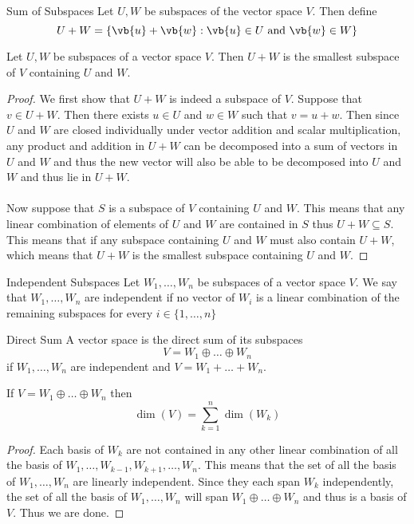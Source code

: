 \begin{defn}{Sum of Subspaces}{} Let $U,W$ be subspaces of the vector space $V$. Then define $$U+W=\{\vb{u}+\vb{w}:\vb{u}\in U\text{ and }\vb{w}\in W\}$$
\end{defn}

\begin{prp}{}{} Let $U,W$ be subspaces of a vector space $V$. Then $U+W$ is the smallest subspace of $V$ containing $U$ and $W$. \tcbline
\begin{proof}
We first show that $U+W$ is indeed a subspace of $V$. Suppose that $v\in U+W$. Then there exists $u\in U$ and $w\in W$ such that $v=u+w$. Then since $U$ and $W$ are closed individually under vector addition and scalar multiplication, any product and addition in $U+W$ can be decomposed into a sum of vectors in $U$ and $W$ and thus the new vector will also be able to be decomposed into $U$ and $W$ and thus lie in $U+W$. \\~\\
Now suppose that $S$ is a subspace of $V$ containing $U$ and $W$. This means that any linear combination of elements of $U$ and $W$ are contained in $S$ thus $U+W\subseteq S$. This means that if any subspace containing $U$ and $W$ must also contain $U+W$, which means that $U+W$ is the smallest subspace containing $U$ and $W$. 
\end{proof}
\end{prp}

\begin{defn}{Independent Subspaces}{} Let $W_1,\dots,W_n$ be subspaces of a vector space $V$. We say that $W_1,\dots,W_n$ are independent if no vector of $W_i$ is a linear combination of the remaining subspaces for every $i\in\{1,\dots,n\}$
\end{defn}

\begin{defn}{Direct Sum}{} A vector space is the direct sum of its subspaces $$V=W_1\oplus\dots\oplus W_n$$ if $W_1,\dots,W_n$ are independent and $V=W_1+\dots+W_n$. 
\end{defn}

\begin{crl}{}{} If $V=W_1\oplus\dots\oplus W_n$ then $$\dim(V)=\sum_{k=1}^n\dim(W_k)$$ \tcbline
\begin{proof}
Each basis of $W_k$ are not contained in any other linear combination of all the basis of $W_1,\dots,W_{k-1},W_{k+1},\dots,W_n$. This means that the set of all the basis of $W_1,\dots,W_n$ are linearly independent. Since they each span $W_k$ independently, the set of all the basis of $W_1,\dots,W_n$ will span $W_1\oplus\dots\oplus W_n$ and thus is a basis of $V$. Thus we are done. 
\end{proof}
\end{crl}

